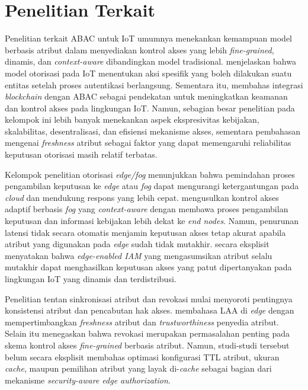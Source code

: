 \section{Penelitian Terkait}

Penelitian terkait ABAC untuk IoT umumnya menekankan kemampuan model berbasis atribut dalam menyediakan kontrol akses yang lebih \textit{fine-grained}, dinamis, dan \textit{context-aware} dibandingkan model tradisional. \textcite{diaz_authorization_2025} menjelaskan bahwa model otorisasi pada IoT menentukan aksi spesifik yang boleh dilakukan suatu entitas setelah proses autentikasi berlangsung. Sementara itu, \textcite{ullah_survey_2023} membahas integrasi \textit{blockchain} dengan ABAC sebagai pendekatan untuk meningkatkan keamanan dan kontrol akses pada lingkungan IoT. Namun, sebagian besar penelitian pada kelompok ini lebih banyak menekankan aspek ekspresivitas kebijakan, skalabilitas, desentralisasi, dan efisiensi mekanisme akses, sementara pembahasan mengenai \textit{freshness} atribut sebagai faktor yang dapat memengaruhi reliabilitas keputusan otorisasi masih relatif terbatas.

Kelompok penelitian otorisasi \textit{edge/fog} menunjukkan bahwa pemindahan proses pengambilan keputusan ke \textit{edge} atau \textit{fog} dapat mengurangi ketergantungan pada \textit{cloud} dan mendukung respons yang lebih cepat. \textcite{kalaria_adaptive_2024} mengusulkan kontrol akses adaptif berbasis \textit{fog} yang \textit{context-aware} dengan membawa proses pengambilan keputusan dan informasi kebijakan lebih dekat ke \textit{end nodes}. Namun, penurunan latensi tidak secara otomatis menjamin keputusan akses tetap akurat apabila atribut yang digunakan pada \textit{edge} sudah tidak mutakhir. \textcite{wang_edge-enabled_2025} secara eksplisit menyatakan bahwa \textit{edge-enabled IAM} yang mengasumsikan atribut selalu mutakhir dapat menghasilkan keputusan akses yang patut dipertanyakan pada lingkungan IoT yang dinamis dan terdistribusi.

Penelitian tentan sinkronisasi atribut dan revokasi mulai menyoroti pentingnya konsistensi atribut dan pencabutan hak akses. \textcite{wang_edge-enabled_2025} membahasa LAA di \textit{edge} dengan mempertimbangkan \textit{freshness} atribut dan \textit{trustworthiness} penyedia atribut. Selain itu \textcite{penuelas-angulo_revocation_2023} menegaskan bahwa revokasi merupakan permasalahan penting pada skema kontrol akses \textit{fine-grained} berbasis atribut. Namun, studi-studi tersebut belum secara eksplisit membahas optimasi konfigurasi TTL atribut, ukuran \textit{cache}, maupun pemilihan atribut yang layak di-\textit{cache} sebagai bagian dari mekanisme \textit{security-aware edge authorization}.

